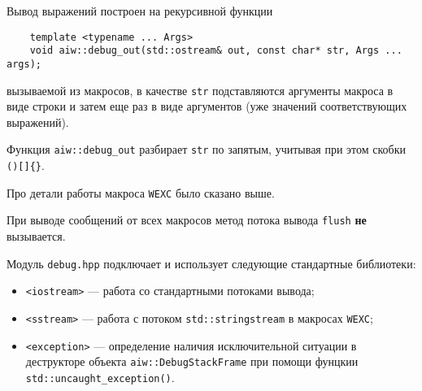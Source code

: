 Вывод выражений построен на рекурсивной функции
\begin{verbatim}
    template <typename ... Args> 
    void aiw::debug_out(std::ostream& out, const char* str, Args ... args);
\end{verbatim}
вызываемой из макросов, в качестве \verb'str' подставляются аргументы макроса в виде строки и затем еще раз
в виде аргументов (уже значений соответствующих выражений). 

Функция \verb'aiw::debug_out' разбирает \verb'str' по запятым, учитывая при этом скобки \verb'()[]{}'.

Про детали работы макроса \verb'WEXC' было сказано выше.

При выводе сообщений от всех макросов метод потока вывода \verb'flush' {\bf не} вызывается. 

Модуль \verb'debug.hpp' подключает и использует следующие стандартные библиотеки:
\begin{itemize}
  \item \verb'<iostream>' --- работа со стандартными потоками вывода;
  \item \verb'<sstream>' --- работа с потоком \verb'std::stringstream' в макросах \verb'WEXC';
  \item \verb'<exception>' --- определение наличия исключительной ситуации в деструкторе объекта \verb'aiw::DebugStackFrame'
    при помощи фунцкии \verb'std::uncaught_exception()'.
\end{itemize}


 
